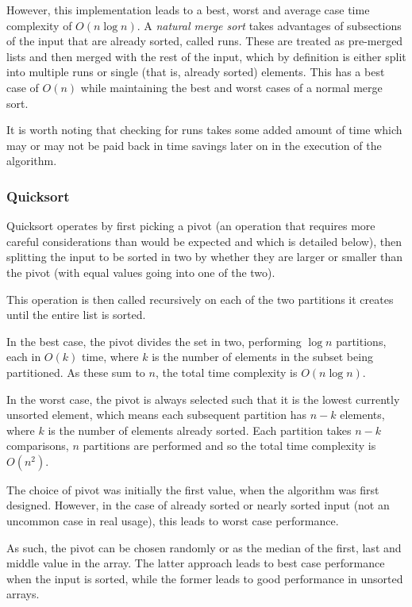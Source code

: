 \documentclass[]{article}
\begin{document}
However, this implementation leads to a best, worst and average case time complexity of $O(n\log{n})$. A \emph{natural merge sort} takes advantages of subsections of the input that are already sorted, called runs. These are treated as pre-merged lists and then merged with the rest of the input, which by definition is either split into multiple runs or single (that is, already sorted) elements. This has a best case of $O(n)$ while maintaining the best and worst cases of a normal merge sort.

It is worth noting that checking for runs takes some added amount of time which may or may not be paid back in time savings later on in the execution of the algorithm.

\subsubsection{Quicksort}

Quicksort operates by first picking a pivot (an operation that requires more careful considerations than would be expected and which is detailed below), then splitting the input to be sorted in two by whether they are larger or smaller than the pivot (with equal values going into one of the two).

This operation is then called recursively on each of the two partitions it creates until the entire list is sorted.

In the best case, the pivot divides the set in two, performing $\log{n}$ partitions, each in $O(k)$ time, where $k$ is the number of elements in the subset being partitioned. As these sum to $n$, the total time complexity is $O(n\log{n})$.

In the worst case, the pivot is always selected such that it is the lowest currently unsorted element, which means each subsequent partition has $n-k$ elements, where $k$ is the number of elements already sorted. Each partition takes $n-k$ comparisons, $n$ partitions are performed and so the total time complexity is $O(n^2)$.

The choice of pivot was initially the first value, when the algorithm was first designed. However, in the case of already sorted or nearly sorted input (not an uncommon case in real usage), this leads to worst case performance.

As such, the pivot can be chosen randomly or as the median of the first, last and middle value in the array. The latter approach leads to best case performance when the input is sorted, while the former leads to good performance in unsorted arrays.
\end{document}
